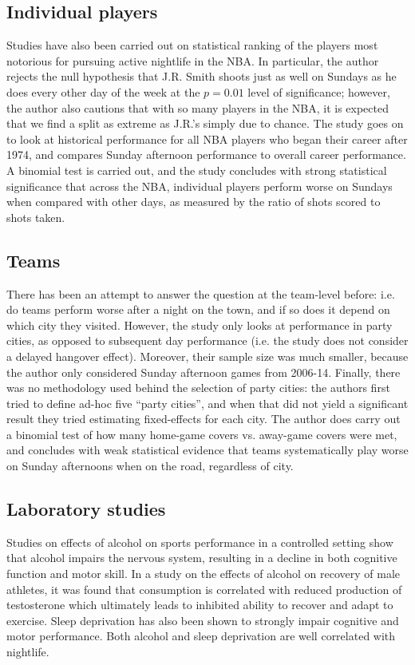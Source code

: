 \documentclass[letterpaper,12pt]{article}
\begin{document}
\subsection{Individual players}
Studies have also been carried out on statistical ranking of the players
most notorious for pursuing active nightlife in the NBA.\citep{chase} In particular, 
the author rejects the null hypothesis that J.R. Smith shoots just as well on Sundays as he does
every other day of the week at the $p=0.01$ level of significance; however, the author also
cautions that with so many players in the NBA, it is expected that we find a split as extreme
as J.R.'s simply due to chance.
The study goes on to look
at historical performance for all NBA players who began their career after 1974, and compares
Sunday afternoon performance to overall career performance. A binomial test is carried out, and the 
study concludes with strong statistical significance that across the NBA, 
individual players perform worse on Sundays when compared with other days, 
as measured by the ratio of shots scored to shots taken.

\subsection{Teams}
There has been an attempt to answer the question at the team-level before: i.e. do teams perform
worse after a night on the town, and if so does it depend on which city they 
visited.\citep{ezekowitz} However, the study only
looks at performance in party cities, as opposed to subsequent day performance (i.e. the study does not consider a delayed hangover effect). Moreover, their sample size was much smaller, because the author only considered Sunday afternoon games
from 2006-14. Finally, there was no methodology used behind the selection of party cities:
the authors first tried to define ad-hoc five ``party cities'', and when that did not yield
a significant result they tried estimating fixed-effects for each city. The author does carry out a binomial test of how many home-game covers vs. away-game covers were met, 
and concludes
with weak statistical evidence that teams systematically play worse on Sunday afternoons 
when on the road, regardless of city.

\subsection{Laboratory studies}
Studies on effects of alcohol on sports performance in a controlled setting
show that alcohol impairs the nervous system, resulting in a decline in both
cognitive function and motor skill.\citep{shirreffs} In a study on 
the effects of alcohol on recovery of male athletes, it was found that
consumption is correlated with reduced production of testosterone
which ultimately leads to inhibited ability to recover and adapt to exercise.\citep{mjbarnes}
Sleep deprivation has also been shown to strongly impair cognitive and motor performance.\citep{pilcher} Both alcohol and sleep deprivation are well correlated with nightlife.
\end{document}

